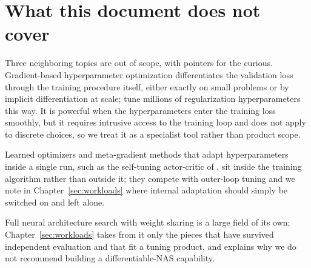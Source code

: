 \section{What this document does not cover}

Three neighboring topics are out of scope, with pointers for the curious.
Gradient-based hyperparameter optimization differentiates the validation loss
through the training procedure itself, either exactly on small problems or by
implicit differentiation at scale; \citet{lorraine2020millions} tune millions
of regularization hyperparameters this way. It is powerful when the
hyperparameters enter the training loss smoothly, but it requires
intrusive access to the training loop and does not apply to discrete
choices, so we treat it as a specialist tool rather than product scope.

Learned optimizers and meta-gradient methods that adapt hyperparameters inside
a single run, such as the self-tuning actor-critic of
\citet{zahavy2020selftuning}, sit inside the training algorithm rather than
outside it; they compete with outer-loop tuning and we note in
Chapter~\ref{sec:workloads} where internal adaptation should simply be
switched on and left alone.

Full neural architecture search with weight
sharing is a large field of its own; Chapter~\ref{sec:workloads} takes from
it only the pieces that have survived independent evaluation and that fit a
tuning product, and explains why we do not recommend building a
differentiable-NAS capability.
